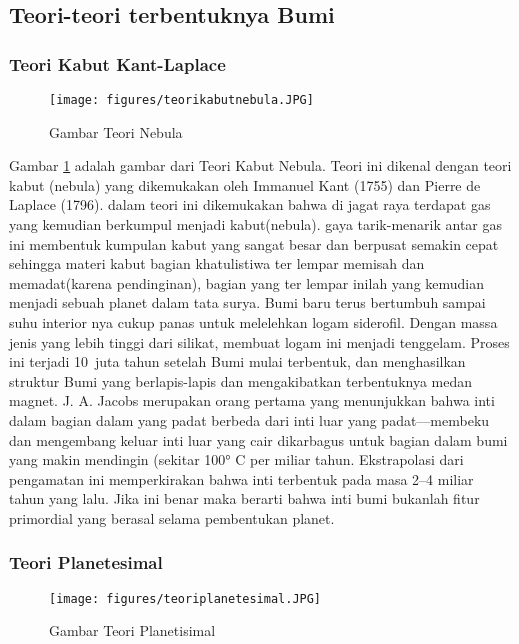 \subsection{Teori-teori terbentuknya Bumi}
\subsubsection{Teori Kabut Kant-Laplace}
\begin{figure} [ht]
	\centerline{\texttt{[image: figures/teorikabutnebula.JPG]}}
	\caption{Gambar Teori Nebula}
	\label{teorikabutnebula}
	\end{figure}

Gambar \ref{teorikabutnebula} adalah gambar dari Teori Kabut Nebula. Teori ini dikenal dengan teori kabut (nebula) yang dikemukakan oleh Immanuel Kant (1755) dan Pierre de Laplace (1796). dalam teori ini dikemukakan bahwa di jagat raya terdapat gas yang kemudian berkumpul menjadi kabut(nebula). gaya tarik-menarik antar gas ini membentuk kumpulan kabut yang sangat besar dan berpusat semakin cepat sehingga materi kabut bagian khatulistiwa ter lempar memisah dan memadat(karena pendinginan), bagian yang ter lempar inilah yang kemudian menjadi sebuah planet dalam tata surya. Bumi baru terus bertumbuh sampai suhu interior nya cukup panas untuk melelehkan logam siderofil. Dengan massa jenis yang lebih tinggi dari silikat, membuat logam ini menjadi tenggelam. Proses ini terjadi 10 juta tahun setelah Bumi mulai terbentuk, dan menghasilkan struktur Bumi yang berlapis-lapis dan mengakibatkan terbentuknya medan magnet. J. A. Jacobs merupakan orang pertama yang menunjukkan bahwa inti dalam bagian dalam yang padat berbeda dari inti luar yang padat—membeku dan mengembang keluar inti luar yang cair dikarbagus untuk bagian dalam bumi yang makin mendingin (sekitar 100° C per miliar tahun. Ekstrapolasi dari pengamatan ini memperkirakan bahwa inti terbentuk pada masa 2–4 miliar tahun yang lalu. Jika ini benar maka berarti bahwa inti bumi bukanlah fitur primordial yang berasal selama pembentukan planet.

\subsubsection{Teori Planetesimal}

\begin{figure} [ht]
	\centerline{\texttt{[image: figures/teoriplanetesimal.JPG]}}
	\caption{Gambar Teori Planetisimal}
	\label{teoriplanetesimal}
	\end{figure}

